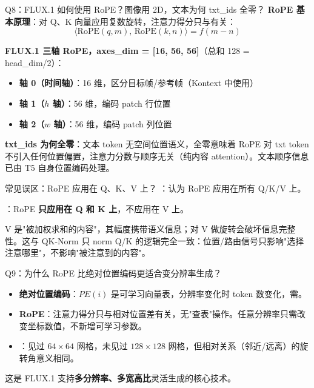 \begin{conceptbox}{Q8：FLUX.1 如何使用 RoPE？图像用 2D，文本为何 txt\_ids 全零？}
\textbf{RoPE 基本原理}：对 Q、K 向量应用复数旋转，注意力得分只与有关：
\[
\langle\text{RoPE}(q, m),\, \text{RoPE}(k, n)\rangle = f(m - n)
\]

\textbf{FLUX.1 三轴 RoPE，axes\_dim = [16, 56, 56]}（总和 128 = head\_dim/2）：
\begin{itemize}
  \item \textbf{轴 0（时间轴）}：16 维，区分目标帧/参考帧（Kontext 中使用）
  \item \textbf{轴 1（$h$ 轴）}：56 维，编码 patch 行位置
  \item \textbf{轴 2（$w$ 轴）}：56 维，编码 patch 列位置
\end{itemize}

\textbf{txt\_ids 为何全零}：文本 token 无空间位置语义，全零意味着 RoPE 对 txt token 不引入任何位置偏置，注意力分数与顺序无关（纯内容 attention）。文本顺序信息已由 T5 自身位置编码处理。
\end{conceptbox}

\begin{warnbox}{常见误区：RoPE 应用在 Q、K、V 上？}
：认为 RoPE 应用在所有 Q/K/V 上。

：RoPE \textbf{只应用在 Q 和 K 上}，不应用在 V 上。

V 是"被加权求和的内容"，其幅度携带语义信息；对 V 做旋转会破坏信息完整性。这与 QK-Norm 只 norm Q/K 的逻辑完全一致：位置/路由信号只影响"选择注意哪里"，不影响"被注意到的内容"。
\end{warnbox}

\begin{conceptbox}{Q9：为什么 RoPE 比绝对位置编码更适合变分辨率生成？}
\begin{itemize}
  \item \textbf{绝对位置编码}：$PE(i)$ 是可学习向量表，分辨率变化时 token 数变化，需。
  \item \textbf{RoPE}：注意力得分只与相对位置差有关，无"查表"操作。任意分辨率只需改变坐标数值，不新增可学习参数。
  \item {}：见过 $64\times64$ 网格，未见过 $128\times128$ 网格，但相对关系（邻近/远离）的旋转角意义相同。
\end{itemize}

这是 FLUX.1 支持\textbf{多分辨率、多宽高比}灵活生成的核心技术。
\end{conceptbox}

